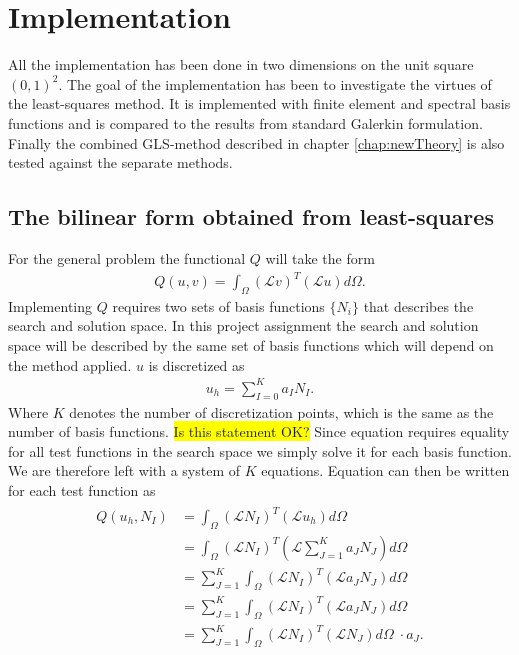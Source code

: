 
\chapter{Implementation} %

\label{chap:Implementation} %



All the implementation has been done in two dimensions on the unit square $(0,1)^2$. The goal of the implementation has been to investigate the virtues of the least-squares method. It is implemented with finite element and spectral basis functions and is compared to the results from standard Galerkin formulation. Finally the combined GLS-method described in chapter \ref{chap:newTheory} is also tested against the separate methods. \section{The bilinear form obtained from least-squares}
 For the general problem the functional $Q$ will take the form 
\begin{align}
	Q(u,v)=\int_{\Omega}(\mathcal{L}v)^T(\mathcal{L}u)d\Omega.
	\label{eq:functionalInt}
\end{align}
Implementing $Q$ requires two sets of basis functions $\{N_i\}$ that describes the search and solution space. In this project assignment the search and solution space will be described by the same set of basis functions which will depend on the method applied. $u$ is discretized as 
\begin{align}
	u_h = \sum_{I=0}^{K}a_IN_I.
	\label{eq:uDisc}
\end{align}
Where $K$ denotes the number of discretization points, which is the same as the number of basis functions. \colorbox{yellow}{Is this statement OK?} Since equation requires equality for all test functions in the search space we simply solve it for each basis function. We are therefore left with a system of $K$ equations. Equation can then be written for each test function as  
\begin{align}
	\begin{split}
	Q(u_h,N_I) &= \int_{\Omega}(\mathcal{L}N_I)^T(\mathcal{L}u_h)d\Omega \\
	&= \int_{\Omega}(\mathcal{L}N_I)^T(\mathcal{L}\sum_{J=1}^Ka_JN_J)d\Omega \\
	&= \sum_{J=1}^K\int_{\Omega}(\mathcal{L}N_I)^T(\mathcal{L}a_JN_J)d\Omega \\
	&= \sum_{J=1}^K\int_{\Omega}(\mathcal{L}N_I)^T(\mathcal{L}a_JN_J)d\Omega \\
	&= \sum_{J=1}^K\int_{\Omega}(\mathcal{L}N_I)^T(\mathcal{L}N_J)d\Omega \;\cdot a_J.
	\end{split}
	\label{eq:varFormDisc}
\end{align}

